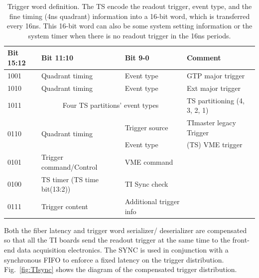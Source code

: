 \begin{table}
\begin{adjustbox}{width=\columnwidth,center}
	\begin{tabular}{| l | l | l | l |}
		\hline \hline
		Bit 15:12		& 	Bit 11:10 &	Bit 9-0	 & Comment		\\
		\hline
	1001	& Quadrant timing	& Event type	 & GTP major trigger \\
	1010	& Quadrant timing	& Event type	 & Ext major trigger \\
	
	1011	& \multicolumn{2}{c}{Four TS partitions’ event types}    & TS partitioning (4, 3, 2, 1) \\

	\multirow{2}{*}{0110}	& \multirow{2}{*}{Quadrant timing}	& Trigger source & TImaster legacy Trigger \\
		    &                   & Event type	 & (TS) VME trigger     \\
	0101	& Trigger command/Control	& VME command \\
	0100	& TS timer (TS time bit(13:2))	& TI Sync check \\
	0111	& Trigger content	& Additional trigger info \\
		\hline \hline
	\end{tabular}
\end{adjustbox}
\caption{Trigger word definition.  The TS encode the readout trigger, event type, and the fine timing (4ns quadrant) information into a 16-bit word, which is transferred every 16ns.  This 16-bit word can also be some system setting information or the system timer when there is no readout trigger in the 16ns periods.}
\label{tab:trigger_word_definition}
\end{table}

Both the fiber latency and trigger word serializer/ deserializer are compensated so that all the TI boards send the readout trigger at the same time to the front-end data acquisition electronics.  The SYNC is used in conjunction with a synchronous FIFO to enforce a fixed latency on the trigger distribution. Fig.~\ref{fig:TIsync} shows the diagram of the compensated trigger distribution.

